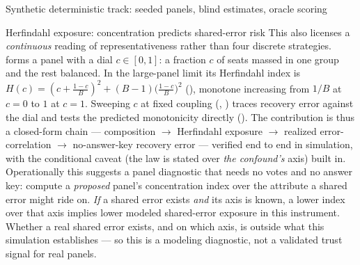 \documentclass[
  ignorenonframetext,
]{beamer}
\begin{document}
\begin{frame}{Synthetic deterministic track:
seeded panels, blind estimates, oracle scoring}
\begin{block}{Herfindahl exposure: concentration predicts shared-error
risk}
This also licenses a \emph{continuous} reading of representativeness
rather than four discrete strategies.
 forms a panel with a dial
\(c\in[0,1]\): a fraction \(c\) of seats massed in one group and the
rest balanced. In the large-panel limit its Herfindahl index is
\(H(c) = (c + \tfrac{1-c}{B})^2 + (B-1)\big(\tfrac{1-c}{B}\big)^2\)
(), monotone increasing from
\(1/B\) at \(c=0\) to \(1\) at \(c=1\). Sweeping \(c\) at fixed coupling
(,
) traces recovery error
against the dial and tests the predicted monotonicity directly
(). The contribution is thus a closed-form chain ---
composition \(\to\) Herfindahl exposure \(\to\) realized
error-correlation \(\to\) no-answer-key recovery error --- verified end
to end in simulation, with the conditional caveat (the law is stated
over \emph{the confound's} axis) built in. Operationally this suggests a
panel diagnostic that needs no votes and no answer key: compute a
\emph{proposed} panel's concentration index over the attribute a shared
error might ride on. \emph{If} a shared error exists \emph{and} its axis
is known, a lower index over that axis implies lower modeled
shared-error exposure in this instrument. Whether a real shared error
exists, and on which axis, is outside what this simulation establishes
--- so this is a modeling diagnostic, not a validated trust signal for
real panels.
\end{block}


\end{frame}
\end{document}
